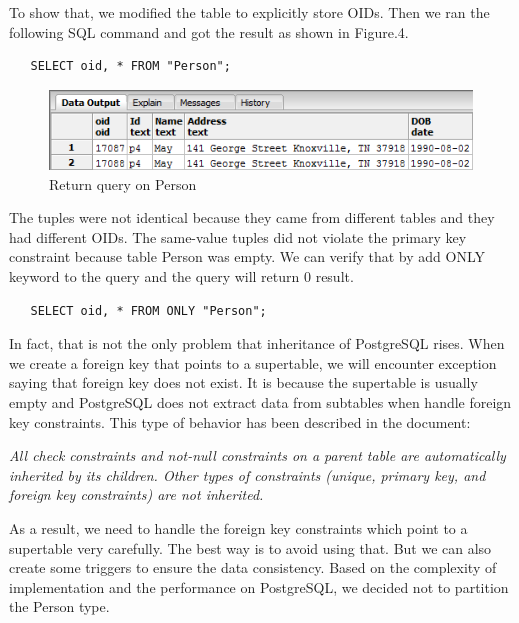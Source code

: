 \documentclass[11pt]{article}
\begin{document}
\par
To show that, we modified the table to explicitly store OIDs. Then we ran the following SQL command and got the result as shown in Figure.4.
\begin{verbatim}
   SELECT oid, * FROM "Person";
\end{verbatim}

\begin{figure}[!htp]
\centering
\includegraphics{F4.png}
\caption{Return query on Person}
\end{figure}

\par
The tuples were not identical because they came from different tables and they had different OIDs. The same-value tuples did not violate the primary key constraint because table Person was empty. We can verify that by add ONLY keyword to the query and the query will return 0 result.
\begin{verbatim}
   SELECT oid, * FROM ONLY "Person";
\end{verbatim}

\par
In fact, that is not the only problem that inheritance of PostgreSQL rises. When we create a foreign key that points to a supertable, we will encounter exception saying that foreign key does not exist. It is because the supertable is usually empty and PostgreSQL does not extract data from subtables when handle foreign key constraints. This type of behavior has been described in the document:
\par
\emph{All check constraints and not-null constraints on a parent table are automatically inherited by its children. Other types of constraints (unique, primary key, and foreign key constraints) are not inherited.}
\par
As a result, we need to handle the foreign key constraints which point to a supertable very carefully. The best way is to avoid using that. But we can also create some triggers to ensure the data consistency. Based on the complexity of implementation and the performance on PostgreSQL, we decided not to partition the Person type.
\end{document}
